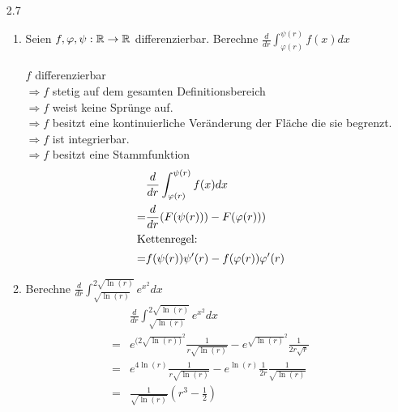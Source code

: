 \documentclass{HM}
\begin{document}
\begin{enumerate}
		\item[2.7]
		\begin{enumerate}
			\item Seien $f,\varphi,\psi:\mathbb{R}\to\mathbb{R}$ differenzierbar. Berechne $\frac{d}{dr}\int_{\varphi(r)}^{\psi(r)}f(x)dx$\\\\
			$f$ differenzierbar\\
			$\Rightarrow f$ stetig auf dem gesamten Definitionsbereich\\
			$\Rightarrow f$ weist keine Sprünge auf.\\
			$\Rightarrow f$ besitzt eine kontinuierliche Veränderung der Fläche die sie begrenzt.\\
			$\Rightarrow f$ ist integrierbar.\\
			$\Rightarrow f$ besitzt eine Stammfunktion
			\begin{align*}
			&\frac{d}{dr}\int_{\varphi(r)}^{\psi(r)}f(x)dx\\
			=&\frac{d}{dr}(F(\psi(r)))-F(\varphi(r)))\\
			\intertext{Kettenregel:}
			=&f(\psi(r))\psi'(r)-f(\varphi(r))\varphi'(r)
			\end{align*}
			\item Berechne $\frac{d}{dr}\int_{\sqrt{\ln(r)}}^{2\sqrt{\ln(r)}}e^{x^2}dx$
			\begin{align*}
			&\frac{d}{dr}\int_{\sqrt{\ln(r)}}^{2\sqrt{\ln(r)}}e^{x^2}dx\\
			=&e^{(2\sqrt{\ln(r))}^2}\frac{1}{r\sqrt{\ln(r)}}-e^{\sqrt{\ln(r)}^2}\frac{1}{2r\sqrt{r}}\\
			=&e^{4\ln(r)}\frac{1}{r\sqrt{\ln(r)}}-e^{\ln(r)}\frac{1}{2r}\frac{1}{\sqrt{\ln(r)}}\\
			=&\frac{1}{\sqrt{\ln(r)}}(r^3-\frac{1}{2})
			\end{align*}
		\end{enumerate}
	\end{enumerate}
\end{document}
